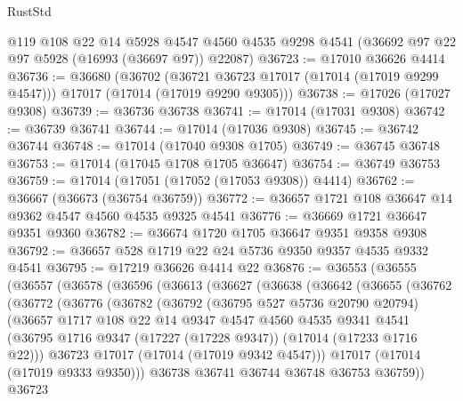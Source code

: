 \begin{lexlean}{RustStd}
\begin{coremodule}
    @119
    @108
    @22
    @14
    @5928
    @4547
    @4560
    @4535
    @9298
    @4541
    (@36692 @97 @22 @97 @5928 (@16993 (@36697 @97)) @22087)
@36723 := @17010 @36626 @4414
@36736 := @36680
    (@36702
      (@36721 @36723 @17017 (@17014 (@17019 @9299 @4547)))
      @17017
      (@17014 (@17019 @9290 @9305)))
@36738 := @17026 (@17027 @9308)
@36739 := @36736 @36738
@36741 := @17014 (@17031 @9308)
@36742 := @36739 @36741
@36744 := @17014 (@17036 @9308)
@36745 := @36742 @36744
@36748 := @17014 (@17040 @9308 @1705)
@36749 := @36745 @36748
@36753 := @17014 (@17045 @1708 @1705 @36647)
@36754 := @36749 @36753
@36759 := @17014 (@17051 (@17052 (@17053 @9308)) @4414)
@36762 := @36667 (@36673 (@36754 @36759))
@36772 := @36657 @1721 @108 @36647 @14 @9362 @4547 @4560 @4535 @9325 @4541
@36776 := @36669 @1721 @36647 @9351 @9360
@36782 := @36674 @1720 @1705 @36647 @9351 @9358 @9308
@36792 := @36657 @528 @1719 @22 @24 @5736 @9350 @9357 @4535 @9332 @4541
@36795 := @17219 @36626 @4414 @22
@36876 := @36553
    (@36555
      (@36557
        (@36578
          (@36596
            (@36613
              (@36627
                (@36638
                  (@36642
                    (@36655
                      (@36762
                        (@36772
                          (@36776
                            (@36782
                              (@36792
                                (@36795 @527 @5736 @20790 @20794)
                                (@36657
                                  @1717
                                  @108
                                  @22
                                  @14
                                  @9347
                                  @4547
                                  @4560
                                  @4535
                                  @9341
                                  @4541
                                  (@36795
                                    @1716
                                    @9347
                                    (@17227 (@17228 @9347))
                                    (@17014 (@17233 @1716 @22)))
                                  @36723
                                  @17017
                                  (@17014 (@17019 @9342 @4547)))
                                @17017
                                (@17014 (@17019 @9333 @9350)))
                              @36738
                              @36741
                              @36744
                              @36748
                              @36753
                              @36759))
                          @36723

\end{coremodule}
\end{lexlean}
